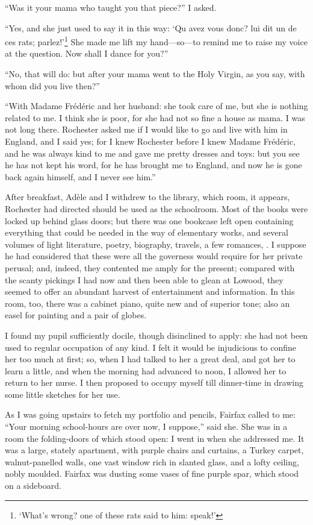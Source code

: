 \enquote{Was it your mama who taught you that piece?} I asked.

\enquote{Yes, and she just used to say it in this way: \foreignquote{french}{Qu
avez vous donc? lui dit un de ces rats; parlez!}\footnote{%
\enquote{What's wrong? one of these rats said to him: speak!}} 
She made me lift my hand---so---to remind me to raise my voice at 
the question. Now shall I dance for you?}

\enquote{No, that will do: but after your mama went to the Holy Virgin,
as you say, with whom did you live then?}

\enquote{With Madame Frédéric and her husband: she took care of me, but
she is nothing related to me. I think she is poor, for she had not so
fine a house as mama. I was not long there. \Mr{} Rochester asked me if
I would like to go and live with him in England, and I said yes; for I
knew \Mr{} Rochester before I knew Madame Frédéric, and he was always kind
to me and gave me pretty dresses and toys: but you see he has not kept
his word, for he has brought me to England, and now he is gone back
again himself, and I never see him.}

After breakfast, Adèle and I withdrew to the library, which room, it
appears, \Mr{} Rochester had directed should be used as the schoolroom. 
Most of the books were locked up behind glass doors; but there was one
bookcase left open containing everything that could be needed in the way
of elementary works, and several volumes of light literature, poetry,
biography, travels, a few romances, \etc. I suppose he had considered
that these were all the governess would require for her private perusal;
and, indeed, they contented me amply for the present; compared with the
scanty pickings I had now and then been able to glean at Lowood, they
seemed to offer an abundant harvest of entertainment and information. 
In this room, too, there was a cabinet piano, quite new and of superior
tone; also an easel for painting and a pair of globes.

I found my pupil sufficiently docile, though disinclined to apply: she
had not been used to regular occupation of any kind. I felt it would be
injudicious to confine her too much at first; so, when I had talked to
her a great deal, and got her to learn a little, and when the morning
had advanced to noon, I allowed her to return to her nurse. I then
proposed to occupy myself till dinner-time in drawing some little
sketches for her use.

As I was going upstairs to fetch my portfolio and pencils, \Mrs{} Fairfax
called to me: \enquote{Your morning school-hours are over now, I
suppose,} said she. She was in a room the folding-doors of which stood
open: I went in when she addressed me. It was a large, stately
apartment, with purple chairs and curtains, a Turkey carpet,
walnut-panelled walls, one vast window rich in slanted glass, and a
lofty ceiling, nobly moulded. \Mrs{} Fairfax was dusting some vases of
fine purple spar, which stood on a sideboard.

